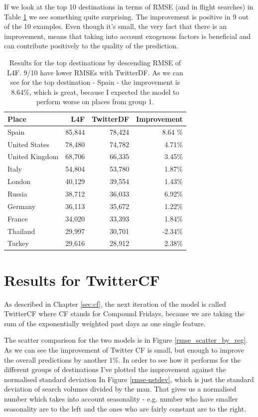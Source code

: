 \documentclass[minf,twoside,singlespacing,parskip,frontabs]{infthesis}
\begin{document}
If we look at the top 10 destinations in terms of RMSE (and in flight searches) in Table \ref{top10} we see something quite surprising.  The improvement is positive in 9 out of the 10 examples. Even though it's small, the very fact that there is an improvement, means that taking into account exogenous factors is beneficial and can contribute positively to the quality of the prediction.

\begin{table}[]
\begin{center}
\begin{tabular}{ l | r | r | r}
Place & L4F & TwitterDF & Improvement \\
\hline
Spain & 85,844 & 78,424 & 8.64 \% \\
United States & 78,480 & 74,782 & 4.71\% \\
United Kingdom & 68,706 & 66,335 & 3.45\% \\
Italy & 54,804 & 53,780 & 1.87\% \\
London & 40,129 & 39,554 & 1.43\% \\
Russia & 38,712 & 36,033 & 6.92\% \\
Germany & 36,113 & 35,672 & 1.22\% \\
France & 34,020 & 33,393 & 1.84\% \\
Thailand & 29,997 & 30,701 & -2.34\% \\
Turkey & 29,616 & 28,912 & 2.38\% 
\end{tabular}
\end{center}
\caption{Results for the top destinations by descending RMSE of L4F. 9/10 have lower RMSEs with TwitterDF. As we can see for the top destination - Spain - the improvement is 8.64\%, which is great, because I expected the model to perform worse on places from group 1.}
\label{top10}
\end{table}



\newpage
\section{Results for TwitterCF}
\label{TwitterCF}

As described in Chapter \ref{sec:cf}, the next iteration of the model is called TwitterCF where CF stands for Compound Fridays, because we are taking the sum of the exponentially weighted past days as one single feature. 

The scatter comparison for the two models is in Figure \ref{rmse_scatter_by_reg}. As we can see the improvement of Twitter CF is small, but enough to improve the overall predictions by another 1\%. In order to see how it performs for the different groups of destinations I've plotted the improvement against the normalised standard deviation In Figure \ref{rmse-nstdev}, which is just the standard deviation of search volumes divided by the man. That gives us a normalised number which takes into account seasonality - e.g. number who have smaller seasonality are to the left and the ones who are fairly constant are to the right. 
\end{document}
